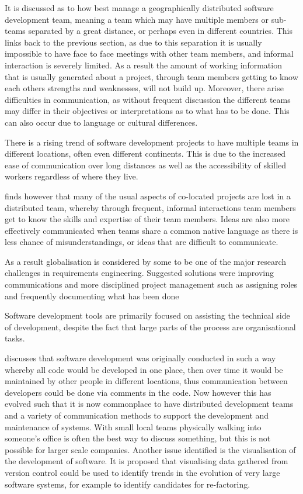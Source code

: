 \documentclass{l4proj}
\begin{document}
It is discussed as to how best manage a geographically distributed software development team, meaning a team which may have multiple members or sub-teams separated by a great distance, or perhaps even in different countries.  This links back to the previous section, as due to this separation it is usually impossible to have face to face meetings with other team members, and informal interaction is severely limited.   As a result the amount of working information that is usually generated about a project, through team members getting to know each others strengths and weaknesses, will not build up.  Moreover, there arise difficulties in communication, as without frequent discussion the different teams may differ in their objectives or interpretations as to what has to be done.  This can also occur due to language or cultural differences.


There is a rising trend of software development projects to have multiple teams in different locations, often even different continents.  This is due to the increased ease of communication over long distances as well as the accessibility of skilled workers regardless of where they live.

\citet{herbsleb07global} finds however that many of the usual aspects of co-located projects are lost in a distributed team, whereby through frequent, informal interactions team members get to know the skills and expertise of their team members.  Ideas are also more effectively communicated when teams share a common native language as there is less chance of misunderstandings, or ideas that are difficult to communicate.

As a result globalisation is considered by some to be one of the major research challenges in requirements engineering.  Suggested solutions were improving communications and more disciplined project management such as assigning roles and frequently documenting what has been done

Software development tools are primarily focused on assisting the technical side of development, despite the fact that large parts of the process are organisational tasks.

\citet{halverson06designing} discusses that software development was originally conducted in such a way whereby all code would be developed in one place, then over time it would be maintained by other people in different locations, thus communication between developers could be done via comments in the code.  Now however this has evolved such that it is now commonplace to have distributed development teams and a variety of communication methods to support the development and maintenance of systems.  With small local teams physically walking into someone's office is often the best way to discuss something, but this is not possible for larger scale companies. Another issue identified is the visualisation of the development of software.  It is proposed that visualising data gathered from version control could be used to identify trends in the evolution of very large software systems, for example to identify candidates for re-factoring.  
\end{document}
